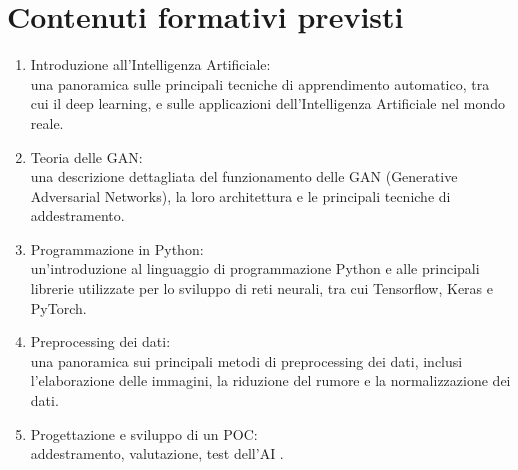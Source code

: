 \newpage
\section*{Contenuti formativi previsti}
\begin{enumerate}
    \item Introduzione all'Intelligenza Artificiale: \\
          una panoramica sulle principali tecniche di apprendimento automatico, tra cui il deep learning, e sulle applicazioni dell'Intelligenza Artificiale nel mondo reale.
    \item Teoria delle GAN: \\
          una descrizione dettagliata del funzionamento delle GAN (Generative Adversarial Networks), la loro architettura e le principali tecniche di addestramento.
    \item Programmazione in Python: \\
          un'introduzione al linguaggio di programmazione Python e alle principali librerie utilizzate per lo sviluppo di reti neurali, tra cui Tensorflow, Keras e PyTorch.
    \item Preprocessing dei dati: \\
          una panoramica sui principali metodi di preprocessing dei dati, inclusi l'elaborazione delle immagini, la riduzione del rumore e la normalizzazione dei dati.
    \item Progettazione e sviluppo di un POC: \\
          addestramento, valutazione, test dell'AI .
\end{enumerate}
\newpage